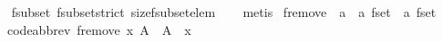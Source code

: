 \begin{isabellebody}
%
\isadelimproof
\ \ %
\endisadelimproof
%
\isatagproof
{}\isamarkupfalse%
\ fsubset\ fsubset{\isacharunderscore}strict\ size{\isacharunderscore}fsubset{\isacharunderscore}elem\isanewline
\ \ \isamarkupfalse%
\ metis%
\endisatagproof
{\isafoldproof}%
%
\isadelimproof
\isanewline
%
\endisadelimproof
\isanewline
{}\isamarkupfalse%
\ fremove\ {\isacharcolon}{\isacharcolon}\ {\isachardoublequoteopen}{\isacharprime}a\ {\isasymRightarrow}\ {\isacharprime}a\ fset\ {\isasymRightarrow}\ {\isacharprime}a\ fset{\isachardoublequoteclose}\isanewline
\ \ \ {\isacharbrackleft}code{\isacharunderscore}abbrev{\isacharbrackright}{\isacharcolon}\ {\isachardoublequoteopen}fremove\ x\ A\ {\isacharequal}\ A\ {\isacharminus}\ {\isacharbraceleft}{\isacharbar}x{\isacharbar}{\isacharbraceright}{\isachardoublequoteclose}\isanewline
%
\isadelimtheory
\isanewline
%
\endisadelimtheory
%
\isatagtheory
{}\isamarkupfalse%
%
\endisatagtheory
{\isafoldtheory}%
%
\isadelimtheory
%
\endisadelimtheory
%
\end{isabellebody}%
\endinput
